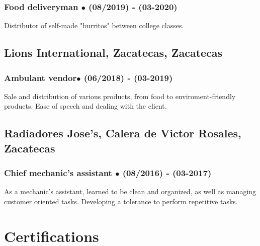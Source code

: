 \documentclass{article}
\begin{document}
  \subsubsection{Food deliveryman $\bullet$ (08/2019) - (03-2020)}

  Distributor of self-made "burritos" between college classes.

  \subsection{\textbf{Lions International}, Zacatecas, Zacatecas}

  \subsubsection{Ambulant vendor$\bullet$ (06/2018) - (03-2019)}

  Sale and distribution of various products, from food to enviroment-friendly products. Ease of speech and dealing with the client.

  \subsection{\textbf{Radiadores Jose's}, Calera de Victor Rosales, Zacatecas}

  \subsubsection{Chief mechanic's assistant $\bullet$ (08/2016) - (03-2017)}

  As a mechanic's assistant, learned to be clean and organized, as well as managing customer oriented tasks. Developing a tolerance to perform repetitive tasks.


  \section{Certifications}
\end{document}
